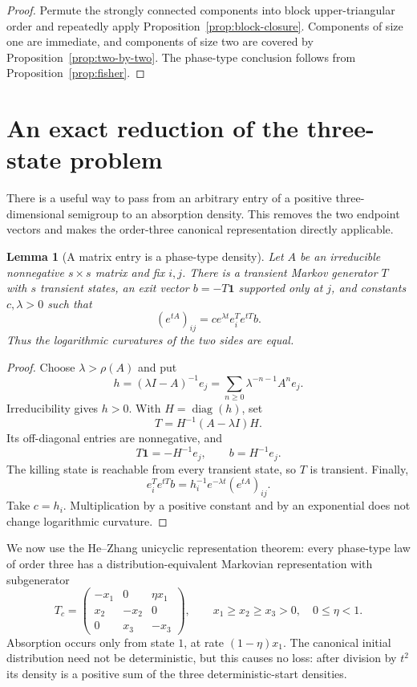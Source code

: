 \documentclass[11pt]{article}
\newtheorem{lemma}[theorem]{Lemma}
\theoremstyle{remark}
\begin{document}
\begin{proof}
Permute the strongly connected components into block upper-triangular order
and repeatedly apply Proposition~\ref{prop:block-closure}.  Components of size
one are immediate, and components of size two are covered by
Proposition~\ref{prop:two-by-two}.  The phase-type conclusion follows from
Proposition~\ref{prop:fisher}.
\end{proof}

\section{An exact reduction of the three-state problem}

There is a useful way to pass from an arbitrary entry of a positive
three-dimensional semigroup to an absorption density.  This removes the two
endpoint vectors and makes the order-three canonical representation directly
applicable.

\begin{lemma}[A matrix entry is a phase-type density]\label{lem:entry-to-ph}
Let $A$ be an irreducible nonnegative $s\times s$ matrix and fix $i,j$.
There is a transient Markov generator $T$ with $s$ transient states, an exit
vector $b=-T\mathbf1$ supported only at $j$, and constants $c,\lambda>0$ such
that
\[
 (e^{tA})_{ij}=c e^{\lambda t}e_i^Te^{tT}b.
\]
Thus the logarithmic curvatures of the two sides are equal.
\end{lemma}

\begin{proof}
Choose $\lambda>\rho(A)$ and put
\[
 h=(\lambda I-A)^{-1}e_j
   =\sum_{n\geq0}\lambda^{-n-1}A^ne_j.
\]
Irreducibility gives $h>0$.  With $H=\operatorname{diag}(h)$, set
\[
 T=H^{-1}(A-\lambda I)H.
\]
Its off-diagonal entries are nonnegative, and
\[
 T\mathbf1=-H^{-1}e_j,
 \qquad b=H^{-1}e_j.
\]
The killing state is reachable from every transient state, so $T$ is
transient.  Finally,
\[
 e_i^Te^{tT}b
 =h_i^{-1}e^{-\lambda t}(e^{tA})_{ij}.
\]
Take $c=h_i$.  Multiplication by a positive constant and by an exponential
does not change logarithmic curvature.
\end{proof}

We now use the He--Zhang unicyclic representation theorem: every phase-type
law of order three has a distribution-equivalent Markovian representation
with subgenerator
\begin{equation}\label{eq:canonical-three}
 T_c=\begin{pmatrix}
 -x_1&0&\eta x_1\\
 x_2&-x_2&0\\
 0&x_3&-x_3
 \end{pmatrix},
 \qquad
 x_1\geq x_2\geq x_3>0,\quad 0\leq\eta<1.
\end{equation}
Absorption occurs only from state $1$, at rate $(1-\eta)x_1$.  The canonical
initial distribution need not be deterministic, but this causes no loss:
after division by $t^2$ its density is a positive sum of the three
deterministic-start densities.
\end{document}
